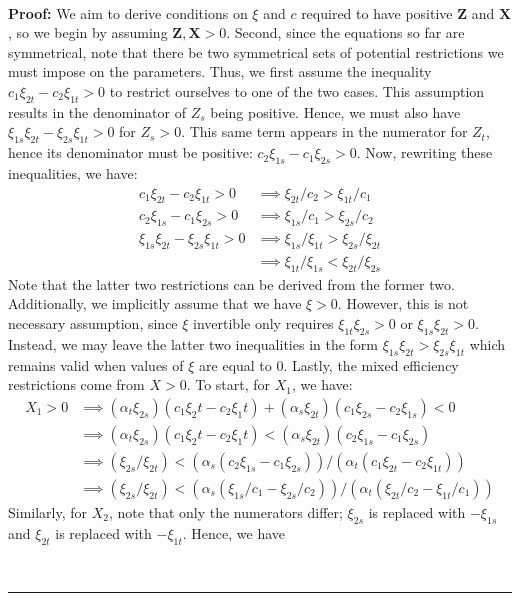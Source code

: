 \documentclass[11pt,a4paper,leqno]{extarticle}
\newenvironment{proof}[1][Proof]{\noindent\textbf{#1:} }{\ \rule{0.5em}{0.5em}}
\begin{document}
	\hfill\\
	\begin{proof}
		We aim to derive conditions on $\xi$ and $c$ required to have positive $\mathbf{Z}$ and $\mathbf{X}$, so we begin by assuming $\mathbf{Z}, \mathbf{X} > 0$. Second, since the equations so far are symmetrical, note that there be two symmetrical sets of potential restrictions we must impose on the parameters. Thus, we first assume the inequality $c_1 \xi_{2t} - c_2 \xi_{1t} > 0$ to restrict ourselves to one of the two cases. This assumption results in the denominator of $Z_s$ being positive. Hence, we must also have $\xi_{1s}\xi_{2t} - \xi_{2s}\xi_{1t} > 0 $ for $Z_s > 0$. This same term appears in the numerator for $Z_t$, hence its denominator must be positive: $c_2 \xi_{1s} - c_1 \xi_{2s} > 0$. Now, rewriting these inequalities, we have:
		\begin{align*}
		c_1 \xi_{2t} - c_2 \xi_{1t} > 0 &\implies \xi_{2t}/c_2 > \xi_{1t}/c_1 \\
		c_2 \xi_{1s} - c_1 \xi_{2s} > 0 &\implies \xi_{1s}/c_1 > \xi_{2s}/c_2 \\
		\xi_{1s}\xi_{2t} - \xi_{2s}\xi_{1t} > 0 &\implies \xi_{1s}/\xi_{1t} > \xi_{2s}/\xi_{2t} \\
		&\implies \xi_{1t}/\xi_{1s} < \xi_{2t}/\xi_{2s} 
		\end{align*}
		Note that the latter two restrictions can be derived from the former two. Additionally, we implicitly assume that we have $\xi > 0$. However, this is not necessary assumption, since $\xi$ invertible only requires $\xi_{1t} \xi_{2s} > 0$ or $\xi_{1s} \xi_{2t} > 0$. Instead, we may leave the latter two inequalities in the form $ \xi_{1s}\xi_{2t} > \xi_{2s}\xi_{1t}$ which remains valid when values of $\xi$ are equal to $0$. Lastly, the mixed efficiency restrictions come from $X > 0$. To start, for $X_1$, we have:
		\begin{align*}
		X_1 > 0 &\implies (\alpha_t \xi_{2s})(c_1 \xi_2t - c_2\xi_1t) + (\alpha_s \xi_{2t})(c_1 \xi_{2s} - c_2 \xi_{1s}) < 0\\
		&\implies (\alpha_t \xi_{2s})(c_1 \xi_2t - c_2\xi_1t) < (\alpha_s \xi_{2t})(c_2 \xi_{1s} - c_1 \xi_{2s}) \\
		&\implies (\xi_{2s}/\xi_{2t}) < (\alpha_s (c_2 \xi_{1s} - c_1 \xi_{2s}))/(\alpha_t(c_1 \xi_{2t} - c_2\xi_{1t})) \\
		&\implies (\xi_{2s}/\xi_{2t}) < (\alpha_s (\xi_{1s}/c_1 -  \xi_{2s}/c_2))/(\alpha_t(\xi_{2t}/c_2 - \xi_{1t}/c_1)) 
		\end{align*}
		Similarly, for $X_2$, note that only the numerators differ; $\xi_{2s}$ is replaced with $-\xi_{1s}$ and $\xi_{2t}$ is replaced with $-\xi_{1t}$. Hence, we have

\end{proof}
\end{document}
